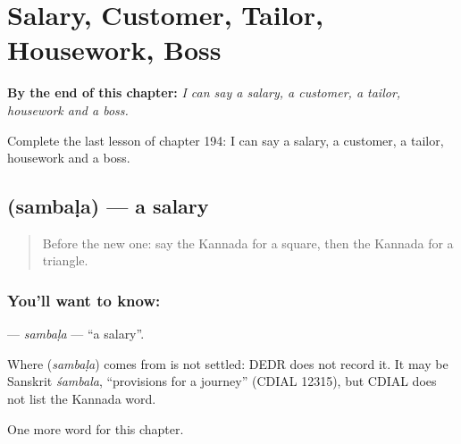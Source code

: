 
\chapter{Salary, Customer, Tailor, Housework, Boss}
\label{ch:ka-salary-customer-tailor-housework-boss}

\begin{chapteropening}
\textbf{By the end of this chapter:} \emph{I can say a salary, a customer, a tailor, housework and a boss.}

Complete the last lesson of chapter 194: I can say a salary, a customer, a tailor, housework and a boss.
\end{chapteropening}

\section[\texorpdfstring{\kn{ಸಂಬಳ} (sambaḷa)}{ಸಂಬಳ (sambaḷa)}]{ (sambaḷa) — a salary}

\label{lesson:KA-C194-sambala}



\begin{quote}
Before the new one: say the Kannada for a square, then the Kannada for a triangle.
\end{quote}

\subsection*{You'll want to know: }
\textbf{} — \emph{sambaḷa} — \textquotedblleft{}a salary\textquotedblright{}.

\begin{cousinweb}
Where \textbf{} (\emph{sambaḷa}) comes from is not settled: DEDR does not record it. It may be Sanskrit \emph{śambala}, \textquotedblleft{}provisions for a journey\textquotedblright{} (CDIAL 12315), but CDIAL does not list the Kannada word.
\end{cousinweb}

\begin{grammarlens}[title={What you've built}]
One more word for this chapter.
\end{grammarlens}

